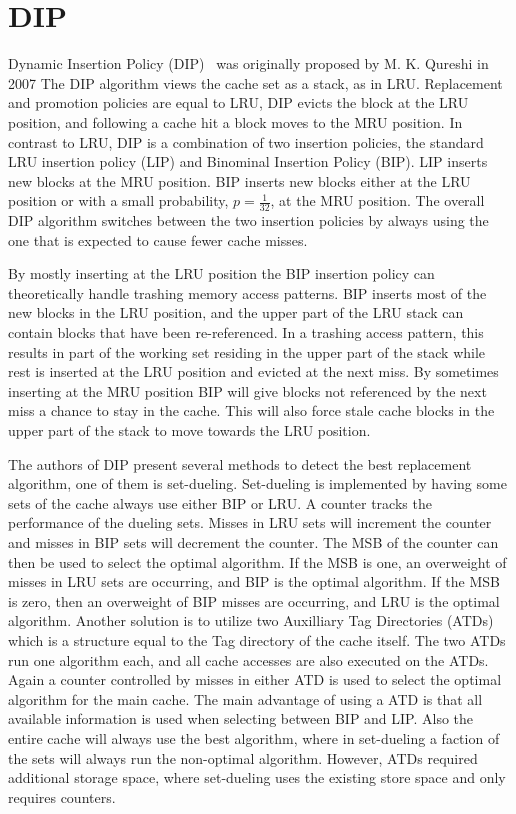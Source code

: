 \section{DIP}
\label{sec:algorithms:dip}

Dynamic Insertion Policy (DIP)~\cite{Qureshi2007} was originally proposed by M. K. Qureshi in 2007
The DIP algorithm views the cache set as a stack, as in LRU.
Replacement and promotion policies are equal to LRU, DIP evicts the block at the LRU position, and following a cache hit a block moves to the MRU position.
In contrast to LRU, DIP is a combination of two insertion policies, the standard LRU insertion policy (LIP) and Binominal Insertion Policy (BIP).
LIP inserts new blocks at the MRU position.
BIP inserts new blocks either at the LRU position or with a small probability, $p = \frac{1}{32}$, at the MRU position. 
The overall DIP algorithm switches between the two insertion policies by always using the one that is expected to cause fewer cache misses.

By mostly inserting at the LRU position the BIP insertion policy can theoretically handle trashing memory access patterns.
BIP inserts most of the new blocks in the LRU position, and the upper part of the LRU stack can contain blocks that have been re-referenced.
In a trashing access pattern, this results in part of the working set residing in the upper part of the stack while rest is inserted at the LRU position and evicted at the next miss.
By sometimes inserting at the MRU position BIP will give blocks not referenced by the next miss a chance to stay in the cache. 
This will also force stale cache blocks in the upper part of the stack to move towards the LRU position.

The authors of DIP present several methods to detect the best replacement algorithm, one of them is set-dueling.
Set-dueling is implemented by having some sets of the cache always use either BIP or LRU. 
A counter tracks the performance of the dueling sets.
Misses in LRU sets will increment the counter and misses in BIP sets will decrement the counter.
The MSB of the counter can then be used to select the optimal algorithm.
If the MSB is one, an overweight of misses in LRU sets are occurring, and BIP is the optimal algorithm. 
If the MSB is zero, then an overweight of BIP misses are occurring, and LRU is the optimal algorithm.
Another solution is to utilize two Auxilliary Tag Directories (ATDs) which is a structure equal to the Tag directory of the cache itself.
The two ATDs run one algorithm each, and all cache accesses are also executed on the ATDs.
Again a counter controlled by misses in either ATD is used to select the optimal algorithm for the main cache.
The main advantage of using a ATD is that all available information is used when selecting between BIP and LIP.
Also the entire cache will always use the best algorithm, where in set-dueling a faction of the sets will always run the non-optimal algorithm.
However, ATDs required additional storage space, where set-dueling uses the existing store space and only requires counters.